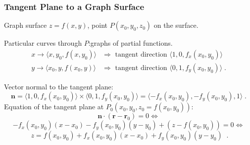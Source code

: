 \begin{frame}
  \frametitle{Tangent Plane to a Graph Surface}

Graph surface $z=f(x,y)$, point $P(x_0,y_0,z_0)$ on the surface.

Particular curves through $P$:\pause graphs of partial functions.
%
\begin{align*}
  x \to \langle x,y_0, f(x,y_0) \rangle & \Longrightarrow \text{ tangent direction } \langle 1,0,f_x(x_0,y_0)\rangle \\
%
     y\to \langle x_0,y, f(x_0,y) \rangle & \Longrightarrow \text{ tangent direction } \langle 0,1,f_y(x_0,y_0)\rangle \; .
\end{align*}

Vector normal to the tangent plane:\pause
%
$$
  \textbf{n} =  \langle 1,0,f_x(x_0,y_0)\rangle \times \langle 0,1,f_y(x_0,y_0)\rangle =
\langle -f_x(x_0,y_0), -f_y(x_0,y_0), 1 \rangle\; .
$$
%
Equation of the tangent plane at $P_0(x_0,y_0,z_0=f(x_0,y_0))$:
%
$$\textbf{n} \cdot (\textbf{r}-\textbf{r}_0) = 0 \Longleftrightarrow$$
%
$$-f_x(x_0,y_0) (x-x_0) -f_y(x_0,y_0)(y-y_0) + (z-f(x_0,y_0)) = 0 \Longleftrightarrow $$
%
$$\boxed{ \; z= f(x_0,y_0) + f_x(x_0,y_0) (x-x_0) + f_y(x_0,y_0)(y-y_0) \; }\; .$$
%
\end{frame}